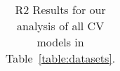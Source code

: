 \begin{table}[t]
\begin{center}
\begin{tabular}{|c|c|c|c|c|c|}
\hline
\end{tabular}
\vspace{-5mm}
\end{center}
\caption{R2 Results for our analysis of all CV models in Table~\ref{table:datasets}. }
\label{table:R2results}
\end{table}

